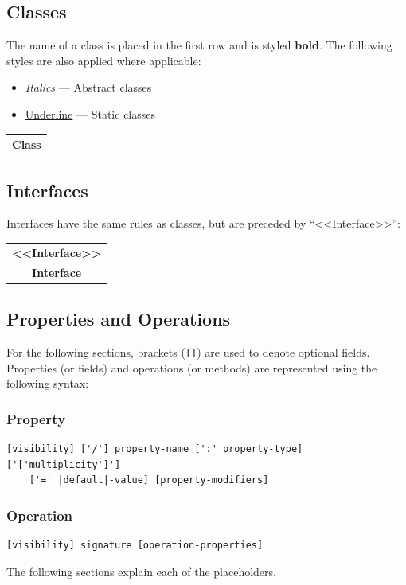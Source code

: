 \documentclass{article}
\begin{document}
\subsection{Classes}
The name of a class is placed in the first row and is styled
\textbf{bold}. The following styles are also applied where applicable:
\begin{itemize}
    \item \textit{Italics} --- Abstract classes
    \item \underline{Underline} --- Static classes
\end{itemize}
\begin{table}[H]
    \centering
    \begin{tabular}{|c|} %
        \hline %
        \textbf{Class} \\
        \hline %
    \end{tabular}
\end{table}
\subsection{Interfaces}
Interfaces have the same rules as classes, but are preceded by
``<<Interface>>'':
\begin{table}[H]
    \centering
    \begin{tabular}{|c|} %
        \hline %
        \textbf{<<Interface>>} \\
        \textbf{Interface}     \\
        \hline %
    \end{tabular}
\end{table}
\subsection{Properties and Operations}
For the following sections, brackets (\texttt{[]}) are used
to denote optional fields. Properties (or fields) and operations (or
methods) are represented using the following syntax:
\subsubsection{Property}
\begin{verbatim}
[visibility] ['/'] property-name [':' property-type] ['['multiplicity']']
    ['=' |default|-value] [property-modifiers]
\end{verbatim}
\subsubsection{Operation}
\begin{verbatim}
[visibility] signature [operation-properties]
\end{verbatim}
The following sections explain each of the placeholders.
\end{document}

